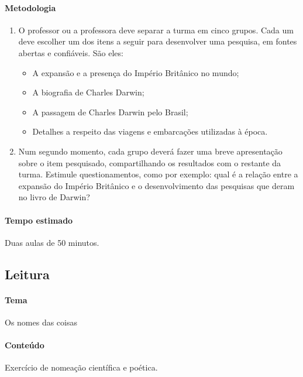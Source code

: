 \documentclass[11pt]{extarticle}
\begin{document}
\paragraph{Metodologia}

\begin{enumerate}

	\item
	O professor ou a professora deve separar a turma em cinco grupos. Cada um deve escolher
	um dos itens a seguir para desenvolver uma pesquisa, em fontes abertas e confiáveis.
	São eles: 
	\begin{itemize}
	\item A expansão e a presença do Império Britânico no mundo;
	\item A biografia de Charles Darwin;
	\item A passagem de Charles Darwin pelo Brasil;
	\item Detalhes a respeito das viagens e embarcações utilizadas à época.
\end{itemize}
	
	\item
	Num segundo momento, cada grupo deverá fazer uma breve apresentação sobre 
	o item pesquisado, compartilhando os resultados com o restante da turma.
	Estimule questionamentos, como por exemplo: qual é a relação entre
	a expansão do Império Britânico e o desenvolvimento das pesquisas
	que deram no livro de Darwin? 

\end{enumerate}

\paragraph{Tempo estimado} Duas aulas de 50 minutos.


\subsection{Leitura}

\paragraph{Tema} Os nomes das coisas

\paragraph{Conteúdo} Exercício de nomeação científica e poética.
\end{document}

